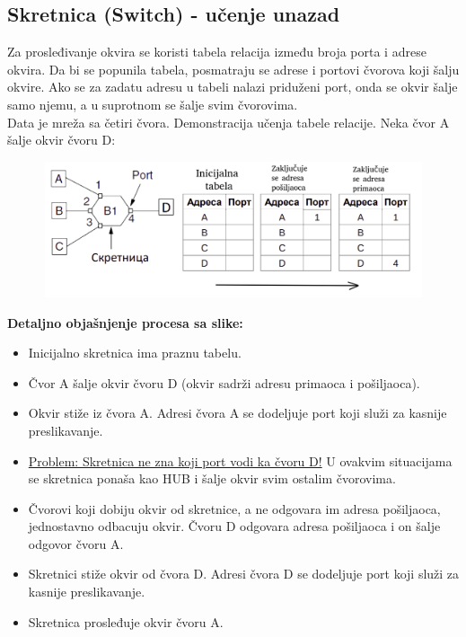 \documentclass[a4paper]{article}
\begin{document}
    \subsection{Skretnica (Switch) - učenje unazad}
        Za prosleđivanje okvira se koristi tabela relacija između
        broja porta i adrese okvira. Da bi se popunila tabela, posmatraju se adrese i portovi
        čvorova koji šalju okvire. Ako se za zadatu adresu u tabeli nalazi priduženi port, onda
        se okvir šalje samo njemu, a u suprotnom se šalje svim čvorovima.\\
        \indent Data je mreža sa četiri čvora. Demonstracija učenja tabele relacije. Neka
        čvor A šalje okvir čvoru D:
        \begin{figure}[H]
            \begin{center}
                \includegraphics[width=120mm,height=40mm]{Slike/skretnica_ucenje.png}
            \end{center}
        \end{figure}

        \noindent \textbf{Detaljno objašnjenje procesa sa slike:} 
        \begin{itemize}
            \item Inicijalno skretnica ima praznu tabelu.
            \item Čvor A šalje okvir čvoru D (okvir sadrži adresu primaoca i pošiljaoca).
            \item Okvir stiže iz čvora A. Adresi čvora A se dodeljuje port koji služi
                  za kasnije preslikavanje.
            \item \underline{Problem: Skretnica ne zna koji port vodi ka čvoru D!}
                  U ovakvim situacijama se skretnica ponaša kao HUB i šalje okvir svim ostalim
                  čvorovima. 
            \item Čvorovi koji dobiju okvir od skretnice, a ne odgovara im adresa pošiljaoca,
                  jednostavno odbacuju okvir. Čvoru D odgovara adresa pošiljaoca i on šalje
                  odgovor čvoru A. 
            \item Skretnici stiže okvir od čvora D. Adresi čvora D se dodeljuje port koji služi
                  za kasnije preslikavanje. 
            \item Skretnica prosleđuje okvir čvoru A.
        \end{itemize}
\end{document}
